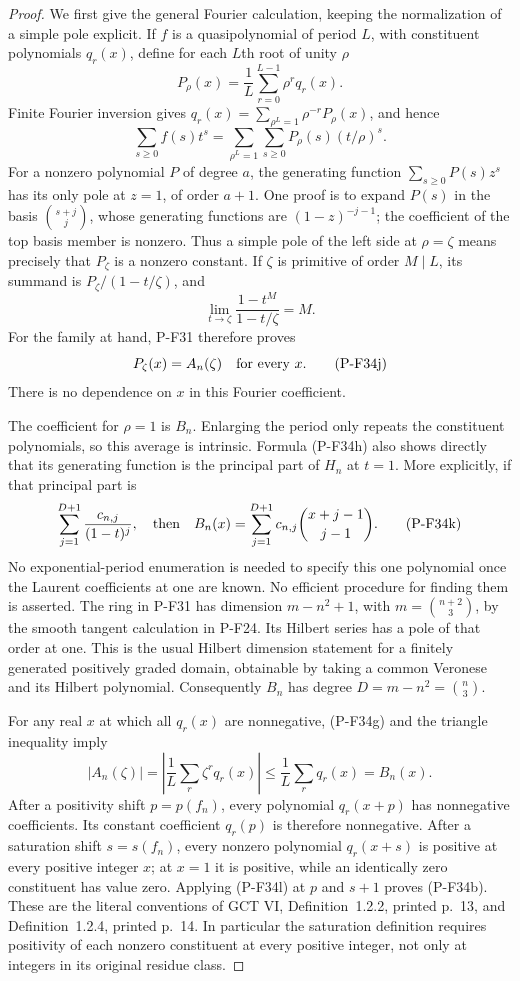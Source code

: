 \begin{proof}
We first give the general Fourier calculation, keeping the
normalization of a simple pole explicit. If $f$ is a
quasipolynomial of period $L$, with constituent polynomials
$q_r(x)$, define for each $L$th root of unity $\rho$
\[
 P_\rho(x)=\frac1L\sum_{r=0}^{L-1}\rho^r q_r(x).
 \tag{P-F34g}
\]
Finite Fourier inversion gives
$q_r(x)=\sum_{\rho^L=1}\rho^{-r}P_\rho(x)$, and hence
\[
 \sum_{s\ge0}f(s)t^s
   =\sum_{\rho^L=1}\sum_{s\ge0}P_\rho(s)(t/\rho)^s.
 \tag{P-F34h}
\]
For a nonzero polynomial $P$ of degree $a$, the generating
function $\sum_{s\ge0}P(s)z^s$ has its only pole at $z=1$,
of order $a+1$. One proof is to expand $P(s)$ in the
basis $\binom{s+j}{j}$, whose generating functions are
$(1-z)^{-j-1}$; the coefficient of the top basis member
is nonzero. Thus a simple pole of the left side at
$\rho=\zeta$ means precisely that $P_\zeta$ is a nonzero
constant. If $\zeta$ is primitive of order $M\mid L$,
its summand is $P_\zeta/(1-t/\zeta)$, and
\[
 \lim_{t\to\zeta}
       \frac{1-t^M}{1-t/\zeta}=M.
 \tag{P-F34i}
\]
For the family at hand, P-F31 therefore proves
\[
                   P_\zeta(x)=A_n(\zeta)
                         \quad\hbox{for every }x.
 \tag{P-F34j}
\]
There is no dependence on $x$ in this Fourier coefficient.

The coefficient for $\rho=1$ is $B_n$. Enlarging the
period only repeats the constituent polynomials, so this
average is intrinsic. Formula (P-F34h) also shows directly
that its generating function is the principal part of
$H_n$ at $t=1$. More explicitly, if that principal part is
\[
 \sum_{j=1}^{D+1}\frac{c_{n,j}}{(1-t)^j},
 \quad\hbox{then}\quad
 B_n(x)=\sum_{j=1}^{D+1}c_{n,j}
                        \binom{x+j-1}{j-1}.
 \tag{P-F34k}
\]
No exponential-period enumeration is needed to specify
this one polynomial once the Laurent coefficients at one
are known. No efficient procedure for finding them is
asserted.
The ring in P-F31 has dimension
$m-n^2+1$, with $m=\binom{n+2}{3}$, by the smooth tangent
calculation in P-F24. Its Hilbert series has a pole of
that order at one. This is the usual Hilbert dimension
statement for a finitely generated positively graded
domain, obtainable by taking a common Veronese and its
Hilbert polynomial. Consequently $B_n$ has degree
$D=m-n^2=\binom n3$.

For any real $x$ at which all $q_r(x)$ are nonnegative,
(P-F34g) and the triangle inequality imply
\[
 |A_n(\zeta)|
   =\left|\frac1L\sum_r\zeta^r q_r(x)\right|
   \le\frac1L\sum_r q_r(x)=B_n(x).
 \tag{P-F34l}
\]
After a positivity shift $p=p(f_n)$, every polynomial
$q_r(x+p)$ has nonnegative coefficients. Its constant
coefficient $q_r(p)$ is therefore nonnegative.
After a saturation shift $s=s(f_n)$, every nonzero
polynomial $q_r(x+s)$ is positive at every positive
integer $x$; at $x=1$ it is positive, while an identically
zero constituent has value zero. Applying (P-F34l) at
$p$ and $s+1$ proves (P-F34b).
These are the literal conventions of GCT VI,
Definition~1.2.2, printed p.~13, and Definition~1.2.4,
printed p.~14. In particular the saturation definition
requires positivity of each nonzero constituent at every
positive integer, not only at integers in its original
residue class.


\end{proof}
